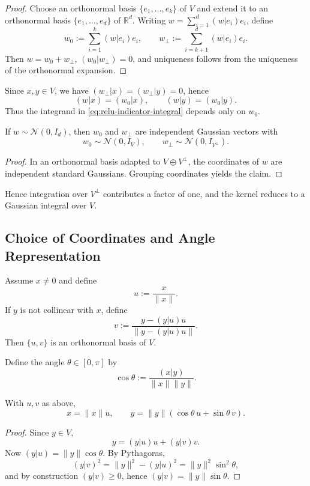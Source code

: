 \begin{proof}
	Choose an orthonormal basis $\{e_1,\dots,e_k\}$ of $V$ and extend it to an
	orthonormal basis $\{e_1,\dots,e_d\}$ of $\mathbb R^d$.
	Writing $w=\sum_{i=1}^d (w|e_i)e_i$, define
	\[
		w_0 := \sum_{i=1}^k (w|e_i)e_i,
		\qquad
		w_\perp := \sum_{i=k+1}^d (w|e_i)e_i.
	\]
	Then $w=w_0+w_\perp$, $(w_0|w_\perp)=0$, and uniqueness follows from the
	uniqueness of the orthonormal expansion.
\end{proof}

Since $x,y\in V$, we have $(w_\perp|x)=(w_\perp|y)=0$, hence
\[
	(w|x)=(w_0|x),
	\qquad
	(w|y)=(w_0|y).
\]
Thus the integrand in \eqref{eq:relu-indicator-integral} depends only on $w_0$.

\begin{lemma}
	\label{lem:gaussian-factor}
	If $w\sim\mathcal N(0,I_d)$, then $w_0$ and $w_\perp$ are independent Gaussian
	vectors with
	\[
		w_0\sim\mathcal N(0,I_V),
		\qquad
		w_\perp\sim\mathcal N(0,I_{V^\perp}).
	\]
\end{lemma}

\begin{proof}
	In an orthonormal basis adapted to $V\oplus V^\perp$, the coordinates of $w$
	are independent standard Gaussians. Grouping coordinates yields the claim.
\end{proof}

Hence integration over $V^\perp$ contributes a factor of one, and the kernel
reduces to a Gaussian integral over $V$.

\subsection{Choice of Coordinates and Angle Representation}

Assume $x\neq 0$ and define
\[
	u := \frac{x}{\|x\|}.
\]
If $y$ is not collinear with $x$, define
\[
	v := \frac{y-(y|u)u}{\|y-(y|u)u\|}.
\]
Then $\{u,v\}$ is an orthonormal basis of $V$.

Define the angle $\theta\in[0,\pi]$ by
\[
	\cos\theta := \frac{(x|y)}{\|x\|\|y\|}.
\]

\begin{lemma}
	\label{lem:angle-decomp}
	With $u,v$ as above,
	\[
		x=\|x\|u,
		\qquad
		y=\|y\|(\cos\theta\,u+\sin\theta\,v).
	\]
\end{lemma}

\begin{proof}
	Since $y\in V$,
	\[
		y=(y|u)u+(y|v)v.
	\]
	Now $(y|u)=\|y\|\cos\theta$. By Pythagoras,
	\[
		(y|v)^2=\|y\|^2-(y|u)^2=\|y\|^2\sin^2\theta,
	\]
	and by construction $(y|v)\ge 0$, hence $(y|v)=\|y\|\sin\theta$.
\end{proof}

